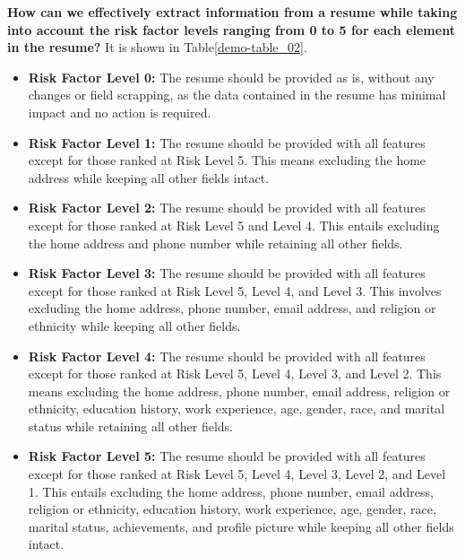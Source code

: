 \documentclass{article}
\begin{document}
\textbf{How can we effectively extract information from a resume while taking into account the risk factor levels ranging from 0 to 5 for each element in the resume?} It is shown in Table\ref{demo-table_02}.

\begin{itemize}
  \item \textbf{Risk Factor Level 0:} The resume should be provided as is, without any changes or field scrapping, as the data contained in the resume has minimal impact and no action is required.
  \item \textbf{Risk Factor Level 1:} The resume should be provided with all features except for those ranked at Risk Level 5. This means excluding the home address while keeping all other fields intact.
  \item \textbf{Risk Factor Level 2:} The resume should be provided with all features except for those ranked at Risk Level 5 and Level 4. This entails excluding the home address and phone number while retaining all other fields.
  \item \textbf{Risk Factor Level 3:} The resume should be provided with all features except for those ranked at Risk Level 5, Level 4, and Level 3. This involves excluding the home address, phone number, email address, and religion or ethnicity while keeping all other fields.
  \item \textbf{Risk Factor Level 4:} The resume should be provided with all features except for those ranked at Risk Level 5, Level 4, Level 3, and Level 2. This means excluding the home address, phone number, email address, religion or ethnicity, education history, work experience, age, gender, race, and marital status while retaining all other fields.
  \item \textbf{Risk Factor Level 5:} The resume should be provided with all features except for those ranked at Risk Level 5, Level 4, Level 3, Level 2, and Level 1. This entails excluding the home address, phone number, email address, religion or ethnicity, education history, work experience, age, gender, race, marital status, achievements, and profile picture while keeping all other fields intact.
\end{itemize}
\end{document}
